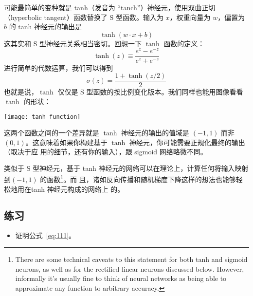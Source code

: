 可能最简单的变种就是 tanh（发音为 “tanch”）神经元，使用双曲正切（hyperbolic
  tangent）函数替换了 S 型函数。输入为 $x$，权重向量为 $w$，偏置为 $b$ 的
tanh 神经元的输出是
\begin{equation}
  \tanh(w \cdot x+b)
  \label{eq:109}\tag{109}
\end{equation}
这其实和 S 型神经元关系相当密切。回想一下 $\tanh$ 函数的定义：
\begin{equation}
  \tanh(z) \equiv \frac{e^z-e^{-z}}{e^z+e^{-z}}
  \label{eq:110}\tag{110}
\end{equation}
进行简单的代数运算，我们可以得到
\begin{equation} 
  \sigma(z) = \frac{1+\tanh(z/2)}{2}
  \label{eq:111}\tag{111}
\end{equation}
也就是说，$\tanh$ 仅仅是 S 型函数的按比例变化版本。我们同样也能用图像看看
$\tanh$ 的形状：
\begin{center}
  \texttt{[image: tanh\_function]}
\end{center}

这两个函数之间的一个差异就是 $\tanh$ 神经元的输出的值域是 $(-1, 1)$ 而非 $(0,
1)$。这意味着如果你构建基于 $\tanh$ 神经元，你可能需要正规化最终的输出（取决于应
  用的细节，还有你的输入），跟 sigmoid 网络略微不同。

类似于 S 型神经元，基于 tanh 神经元的网络可以在理论上，计算任何将输入映射到$(-1,
1)$ 的函数\footnote{There are some technical caveats to this statement for both
  tanh and sigmoid neurons, as well as for the rectified linear neurons
  discussed below. However, informally it's usually fine to think of neural
  networks as being able to approximate any function to arbitrary accuracy.}。而
且，诸如反向传播和随机梯度下降这样的想法也能够轻松地用在tanh 神经元构成的网络上
的。

\subsection*{练习}

\begin{itemize}
\item 证明公式~\eqref{eq:111}。
\end{itemize}

